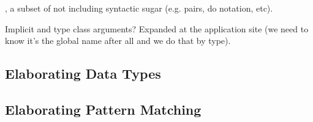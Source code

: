 \IdrisM{}, a subset of \Idris{} not including syntactic sugar (e.g. pairs, do notation, etc).

Implicit and type class arguments? Expanded at the application site (we need to know
it's the global name after all and we do that by type).

\subsection{Elaborating Data Types}

\subsection{Elaborating Pattern Matching}

